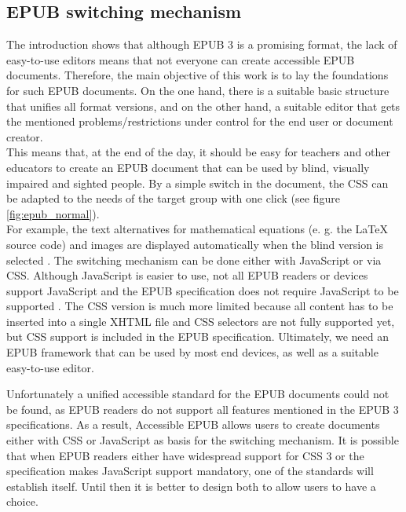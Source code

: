 \documentclass[runningheads,a4paper]{llncs}
\begin{document}
\subsection{EPUB switching mechanism}
The introduction shows that although EPUB 3 is a promising format, the lack of easy-to-use editors means that not everyone can create accessible EPUB documents. Therefore, the main objective of this work is to lay the foundations for such EPUB documents. On the one hand, there is a suitable basic structure that unifies all format versions, and on the other hand, a suitable editor that gets the mentioned problems/restrictions under control for the end user or document creator.\\
This means that, at the end of the day, it should be easy for teachers and other educators to create an EPUB document that can be used by blind, visually impaired and sighted people. By a simple switch in the document, the CSS can be adapted to the needs of the target group with one click (see figure \ref{fig:epub_normal}).\\
For example, the text alternatives for mathematical equations (e. g. the \LaTeX $\mbox{ }$ source code) and images are displayed automatically when the blind version is selected \cite{EPUB3bp}. The switching mechanism can be done either with JavaScript or via CSS. Although JavaScript is easier to use, not all EPUB readers or devices support JavaScript and the EPUB specification does not require JavaScript to be supported \cite{EPUB3bp}. The CSS version is much more limited because all content has to be inserted into a single XHTML file and CSS selectors are not fully supported yet, but CSS support is included in the EPUB specification. Ultimately, we need an EPUB framework that can be used by most end devices, as well as a suitable easy-to-use editor.

Unfortunately a unified accessible standard for the EPUB documents could not be found, as EPUB readers do not support all features mentioned in the EPUB 3 specifications. As a result, Accessible EPUB allows users to create documents either with CSS or JavaScript as basis for the switching mechanism. It is possible that when EPUB readers either have  widespread support for CSS 3 or the specification makes JavaScript support mandatory, one of the standards will establish itself. Until then it is better to design both to allow users to have a choice.
\end{document}
